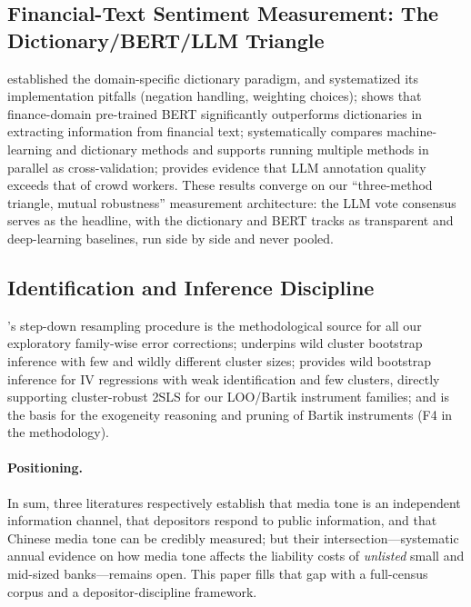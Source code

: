 \subsection{Financial-Text Sentiment Measurement: The
Dictionary/BERT/LLM Triangle}
\textcite{loughran2011liability} established the domain-specific
dictionary paradigm, and \textcite{loughran2016survey} systematized its
implementation pitfalls (negation handling, weighting choices);
\textcite{huang2023finbert} shows that finance-domain pre-trained BERT
significantly outperforms dictionaries in extracting information from
financial text; \textcite{frankel2022disclosure} systematically
compares machine-learning and dictionary methods and supports running
multiple methods in parallel as cross-validation;
\textcite{gilardi2023chatgpt} provides evidence that LLM annotation
quality exceeds that of crowd workers. These results converge on our
``three-method triangle, mutual robustness'' measurement architecture:
the LLM vote consensus serves as the headline, with the dictionary and
BERT tracks as transparent and deep-learning baselines, run side by
side and never pooled.

\subsection{Identification and Inference Discipline}
\textcite{romanowolf2005stepwise}'s step-down resampling procedure is
the methodological source for all our exploratory family-wise error
corrections; \textcite{mackinnon2017wild} underpins wild cluster
bootstrap inference with few and wildly different cluster sizes;
\textcite{wang2024wildiv} provides wild bootstrap inference for IV
regressions with weak identification and few clusters, directly
supporting cluster-robust 2SLS for our LOO/Bartik instrument families;
and \textcite{goldsmith2020bartik} is the basis for the exogeneity
reasoning and pruning of Bartik instruments (F4 in the methodology).

\paragraph{Positioning.}
In sum, three literatures respectively establish that media tone is an
independent information channel, that depositors respond to public
information, and that Chinese media tone can be credibly measured; but
their intersection---systematic annual evidence on how media tone
affects the liability costs of \emph{unlisted} small and mid-sized
banks---remains open. This paper fills that gap with a full-census
corpus and a depositor-discipline framework.

